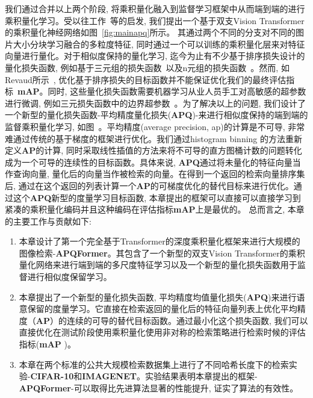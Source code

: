 我们通过合并以上两个阶段, 将乘积量化融入到监督学习框架中从而端到端的进行乘积量化学习。受以往工作~\cite{jang2020generalized, yu2018product, dosovitskiy2020image, chen2021crossvit}等的启发, 我们提出一个基于双支Vision Transformer的乘积量化神经网络如图~\ref{fig:mainapq}所示。 其通过两个不同的分支对不同的图片大小分块学习融合的多粒度特征, 同时通过一个可以训练的乘积量化层来对特征向量进行量化。对于相似度保持的量化学习, 迄今为止有不少基于排序损失设计的量化损失函数, 例如基于三元组的损失函数~\cite{jegou2010product}以及n元组的损失函数~\cite{jang2020generalized}。然而, 如Revaud所示~\cite{revaud2019learning}, 优化基于排序损失的目标函数并不能保证优化我们的最终评估指标~\textbf{mAP}。同时, 这些量化损失函数需要机器学习从业人员手工对高敏感的超参数进行微调, 例如三元损失函数中的边界超参数~\cite{cakir2019deep}。为了解决以上的问题, 我们设计了一个新型的量化损失函数-平均精度量化损失(\textbf{APQ})-来进行相似度保持的端到端的监督乘积量化学习, 如图~。平均精度(average precision, ap)的计算是不可导, 非常难通过传统的基于梯度的框架进行优化。我们通过histogram binning 的方法重新定义\textbf{AP}的计算, 同时采取线性插值的方法来将不可导的直方图桶计数的问题转化成为一个可导的连续性的目标函数。具体来说, \textbf{APQ}通过将未量化的特征向量当作查询向量, 量化后的向量当作被检索的向量。在得到一个返回的检索向量排序集后, 通过在这个返回的列表计算一个\textbf{AP}的可梯度优化的替代目标来进行优化。通过这个\textbf{APQ}新型的度量学习目标函数, 本章提出的框架可以直接可以直接学习到紧凑的乘积量化编码并且这种编码在评估指标\textbf{mAP}上是最优的。 总而言之, 本章的主要工作与贡献如下:
\begin{enumerate}
    \item 本章设计了第一个完全基于Transformer的深度乘积量化框架来进行大规模的图像检索-\textbf{APQFormer}。其包含了一个新型的双支Vision Transformer的乘积量化网络来进行端到端的多尺度特征学习以及一个新型的量化损失函数用于监督进行相似度保留学习。
    \item 本章提出了一个新型的量化损失函数, 平均精度均值量化损失(\textbf{APQ})来进行语意保留的度量学习。它直接在检索返回的量化后的特征向量列表上优化平均精度（\textbf{AP}）的连续的可导的替代目标函数。通过最小化这个损失函数, 我们可以直接优化在测试阶段使用乘积量化使用非对称的检索策略进行检索时候的评估指标(\textbf{mAP} )。
    \item 本章在两个标准的公共大规模检索数据集上进行了不同哈希长度下的检索实验-\textbf{CIFAR-10}和\textbf{IMAGENET}。实验结果表明本章提出的框架-\textbf{APQFormer}-可以取得比先进算法显著的性能提升, 证实了算法的有效性。
\end{enumerate}

